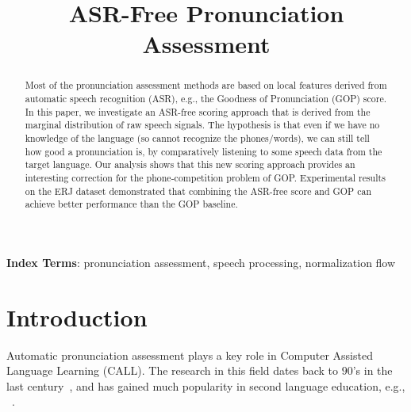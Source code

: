 \documentclass[a4paper]{article}
\title{ASR-Free Pronunciation Assessment}
\begin{document}
\maketitle
%
\begin{abstract}
Most of the pronunciation assessment methods are based on local features derived from automatic speech recognition (ASR), e.g.,
the Goodness of Pronunciation (GOP) score. In this paper, we investigate an ASR-free scoring approach that is derived from
the marginal distribution of raw speech signals.
The hypothesis is that even if we have no knowledge of the language (so cannot recognize the phones/words),
we can still tell how good a pronunciation is, by comparatively listening to some speech data from the target language.
Our analysis shows that this new scoring approach provides an interesting correction for the
phone-competition problem of GOP.
Experimental results on the ERJ dataset demonstrated that combining the ASR-free score and GOP can achieve better performance than the GOP baseline.

\end{abstract}
\noindent\textbf{Index Terms}: pronunciation assessment, speech processing, normalization flow

\section{Introduction}

Automatic pronunciation assessment plays a key role in Computer Assisted Language Learning (CALL). The research in this
field dates back to $90$'s in the last century~\cite{neumeyer1996automatic,franco1997automatic}, and has gained much popularity in
second language education, e.g., ~\cite{zechner2009automatic,eskenazi2009overview,Cheng2018,Miwardelli2019,Yarra2019}.
\end{document}
